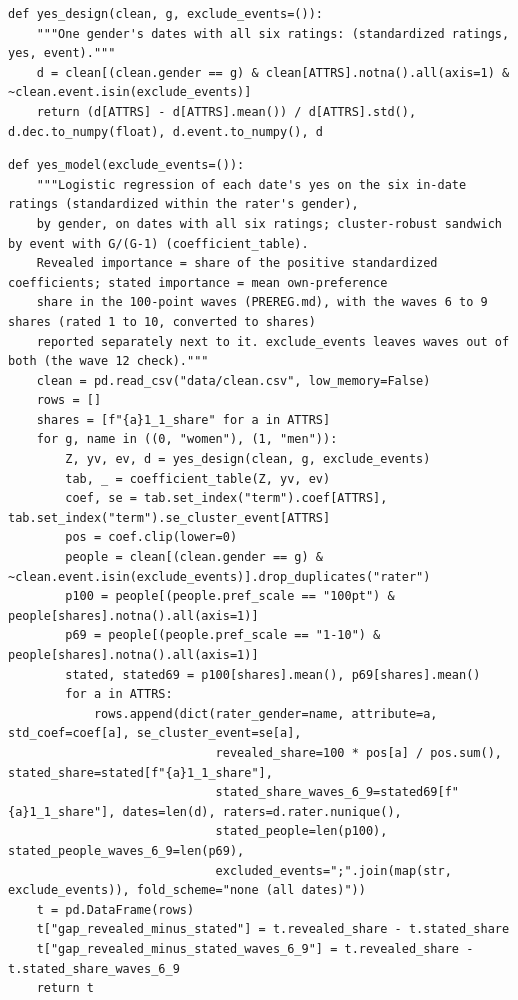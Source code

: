 \documentclass[11pt]{article}
\begin{document}
\begin{lstlisting}[caption={The yes-model design (scripts/part1\_models.py)}]
def yes_design(clean, g, exclude_events=()):
    """One gender's dates with all six ratings: (standardized ratings, yes, event)."""
    d = clean[(clean.gender == g) & clean[ATTRS].notna().all(axis=1) & ~clean.event.isin(exclude_events)]
    return (d[ATTRS] - d[ATTRS].mean()) / d[ATTRS].std(), d.dec.to_numpy(float), d.event.to_numpy(), d
\end{lstlisting}

\begin{lstlisting}[caption={The yes model and stated-versus-revealed table (scripts/part1\_models.py)}]
def yes_model(exclude_events=()):
    """Logistic regression of each date's yes on the six in-date ratings (standardized within the rater's gender),
    by gender, on dates with all six ratings; cluster-robust sandwich by event with G/(G-1) (coefficient_table).
    Revealed importance = share of the positive standardized coefficients; stated importance = mean own-preference
    share in the 100-point waves (PREREG.md), with the waves 6 to 9 shares (rated 1 to 10, converted to shares)
    reported separately next to it. exclude_events leaves waves out of both (the wave 12 check)."""
    clean = pd.read_csv("data/clean.csv", low_memory=False)
    rows = []
    shares = [f"{a}1_1_share" for a in ATTRS]
    for g, name in ((0, "women"), (1, "men")):
        Z, yv, ev, d = yes_design(clean, g, exclude_events)
        tab, _ = coefficient_table(Z, yv, ev)
        coef, se = tab.set_index("term").coef[ATTRS], tab.set_index("term").se_cluster_event[ATTRS]
        pos = coef.clip(lower=0)
        people = clean[(clean.gender == g) & ~clean.event.isin(exclude_events)].drop_duplicates("rater")
        p100 = people[(people.pref_scale == "100pt") & people[shares].notna().all(axis=1)]
        p69 = people[(people.pref_scale == "1-10") & people[shares].notna().all(axis=1)]
        stated, stated69 = p100[shares].mean(), p69[shares].mean()
        for a in ATTRS:
            rows.append(dict(rater_gender=name, attribute=a, std_coef=coef[a], se_cluster_event=se[a],
                             revealed_share=100 * pos[a] / pos.sum(), stated_share=stated[f"{a}1_1_share"],
                             stated_share_waves_6_9=stated69[f"{a}1_1_share"], dates=len(d), raters=d.rater.nunique(),
                             stated_people=len(p100), stated_people_waves_6_9=len(p69),
                             excluded_events=";".join(map(str, exclude_events)), fold_scheme="none (all dates)"))
    t = pd.DataFrame(rows)
    t["gap_revealed_minus_stated"] = t.revealed_share - t.stated_share
    t["gap_revealed_minus_stated_waves_6_9"] = t.revealed_share - t.stated_share_waves_6_9
    return t
\end{lstlisting}
\end{document}
